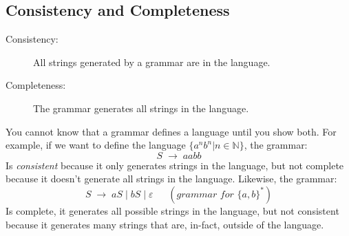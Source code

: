 \documentclass[10pt,landscape]{article}
\newcommand{\spto}{\;\to\;}
\begin{document}
\begin{multicols*}{3}
\subsection{Consistency and Completeness}
\begin{description}
    \item[Consistency:] All strings generated by a grammar are 
    in the language.
    \item[Completeness:] The grammar generates all strings 
    in the language.
\end{description}

You cannot know that a grammar defines a language until you show both.
For example, if we want to define the language $\{a^nb^n | n \in \mathbb{N}\}$,
the grammar:
\[
    S \spto aabb
\]
Is \textit{consistent} because it only generates strings in the language,
but not complete because it doesn't generate all strings in the language.
Likewise, the grammar:
\[
    S \spto aS \;|\; bS \;|\; \varepsilon 
    \;\;\quad (\textit{grammar for }\{a, b\}^*)
\]
Is complete, it generates all possible strings in the language, but not
consistent because it generates many strings that are, in-fact, outside of
the language.


\end{multicols*}
\end{document}
